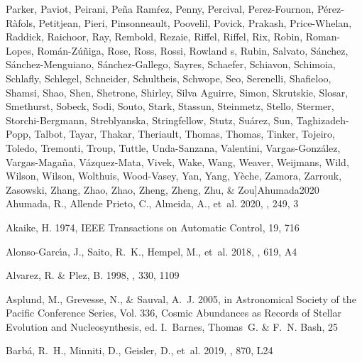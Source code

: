 \documentclass[longauth]{aa} %
\begin{document}
\begin{thebibliography}{112}
{		{Parker}, {Paviot}, {Peirani}, {Pe{\~n}a Ram{\'r}ez}, {Penny}, {Percival},
		{Perez-Fournon}, {P{\'e}rez-R{\`a}fols}, {Petitjean}, {Pieri},
		{Pinsonneault}, {Poovelil}, {Povick}, {Prakash}, {Price-Whelan}, {Raddick},
		{Raichoor}, {Ray}, {Rembold}, {Rezaie}, {Riffel}, {Riffel}, {Rix}, {Robin},
		{Roman-Lopes}, {Rom{\'a}n-Z{\'u}{\~n}iga}, {Rose}, {Ross}, {Rossi}, {Rowland
			s}, {Rubin}, {Salvato}, {S{\'a}nchez}, {S{\'a}nchez-Menguiano},
		{S{\'a}nchez-Gallego}, {Sayres}, {Schaefer}, {Schiavon}, {Schimoia},
		{Schlafly}, {Schlegel}, {Schneider}, {Schultheis}, {Schwope}, {Seo},
		{Serenelli}, {Shafieloo}, {Shamsi}, {Shao}, {Shen}, {Shetrone}, {Shirley},
		{Silva Aguirre}, {Simon}, {Skrutskie}, {Slosar}, {Smethurst}, {Sobeck},
		{Sodi}, {Souto}, {Stark}, {Stassun}, {Steinmetz}, {Stello}, {Stermer},
		{Storchi-Bergmann}, {Streblyanska}, {Stringfellow}, {Stutz}, {Su{\'a}rez},
		{Sun}, {Taghizadeh-Popp}, {Talbot}, {Tayar}, {Thakar}, {Theriault}, {Thomas},
		{Thomas}, {Tinker}, {Tojeiro}, {Toledo}, {Tremonti}, {Troup}, {Tuttle},
		{Unda-Sanzana}, {Valentini}, {Vargas-Gonz{\'a}lez}, {Vargas-Maga{\~n}a},
		{V{\'a}zquez-Mata}, {Vivek}, {Wake}, {Wang}, {Weaver}, {Weijmans}, {Wild},
		{Wilson}, {Wilson}, {Wolthuis}, {Wood-Vasey}, {Yan}, {Yang}, {Y{\`e}che},
		{Zamora}, {Zarrouk}, {Zasowski}, {Zhang}, {Zhao}, {Zhao}, {Zheng}, {Zheng},
		{Zhu}, \& {Zou}}]{Ahumada2020}
	{Ahumada}, R., {Allende Prieto}, C., {Almeida}, A., {et~al.} 2020, \apjs, 249,
	3
	
	{Akaike}, H. 1974, IEEE Transactions on Automatic Control, 19, 716
	
	{Alonso-Garc{\'\i}a}, J., {Saito}, R.~K., {Hempel}, M., {et~al.} 2018, \aap,
	619, A4
	
	{Alvarez}, R. \& {Plez}, B. 1998, \aap, 330, 1109
	
	{Asplund}, M., {Grevesse}, N., \& {Sauval}, A.~J. 2005, in Astronomical Society
	of the Pacific Conference Series, Vol. 336, Cosmic Abundances as Records of
	Stellar Evolution and Nucleosynthesis, ed. I.~{Barnes}, Thomas~G. \& F.~N.
	{Bash}, 25
	
	{Barb{\'a}}, R.~H., {Minniti}, D., {Geisler}, D., {et~al.} 2019, \apjl, 870,
	L24
	

\end{thebibliography}
\end{document}
